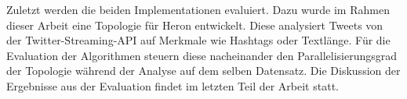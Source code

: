 Zuletzt werden die beiden Implementationen evaluiert.
Dazu wurde im Rahmen dieser Arbeit eine Topologie für Heron entwickelt.
Diese analysiert Tweets von der Twitter-Streaming-API auf Merkmale wie Hashtags oder Textlänge.
Für die Evaluation der Algorithmen steuern diese nacheinander den Parallelisierungsgrad der Topologie während der Analyse auf dem selben Datensatz.
Die Diskussion der Ergebnisse aus der Evaluation findet im letzten Teil der Arbeit statt.